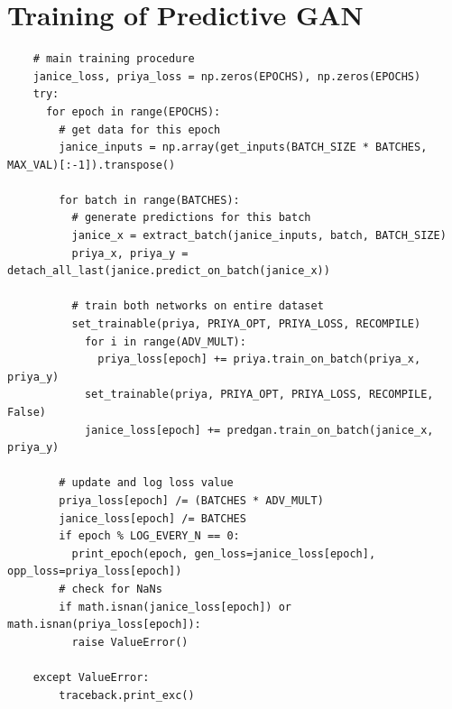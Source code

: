 \documentclass[12pt, titlepage]{report}
\theoremstyle{definition}
\begin{document}
\section{Training of Predictive GAN}\label{appendix:training_predgan}
\begin{verbatim}
    # main training procedure
    janice_loss, priya_loss = np.zeros(EPOCHS), np.zeros(EPOCHS)
    try:
      for epoch in range(EPOCHS):
        # get data for this epoch
        janice_inputs = np.array(get_inputs(BATCH_SIZE * BATCHES, MAX_VAL)[:-1]).transpose()

        for batch in range(BATCHES):
          # generate predictions for this batch
          janice_x = extract_batch(janice_inputs, batch, BATCH_SIZE)
          priya_x, priya_y = detach_all_last(janice.predict_on_batch(janice_x))

          # train both networks on entire dataset
          set_trainable(priya, PRIYA_OPT, PRIYA_LOSS, RECOMPILE)
            for i in range(ADV_MULT):
              priya_loss[epoch] += priya.train_on_batch(priya_x, priya_y)
            set_trainable(priya, PRIYA_OPT, PRIYA_LOSS, RECOMPILE, False)
            janice_loss[epoch] += predgan.train_on_batch(janice_x, priya_y)

        # update and log loss value
        priya_loss[epoch] /= (BATCHES * ADV_MULT)
        janice_loss[epoch] /= BATCHES
        if epoch % LOG_EVERY_N == 0:
          print_epoch(epoch, gen_loss=janice_loss[epoch], opp_loss=priya_loss[epoch])
        # check for NaNs
        if math.isnan(janice_loss[epoch]) or math.isnan(priya_loss[epoch]):
          raise ValueError()

    except ValueError:
        traceback.print_exc()
\end{verbatim}
\end{document}
